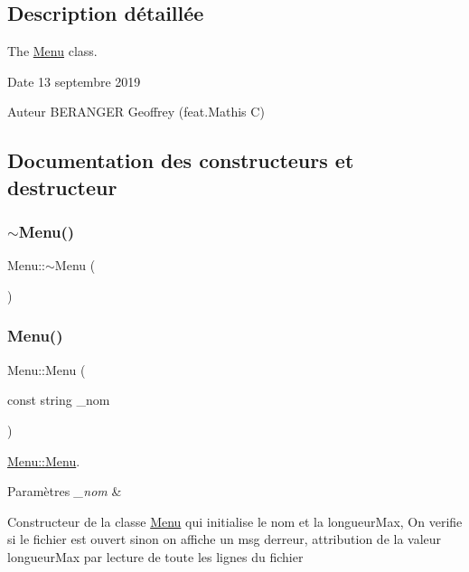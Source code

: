 \subsection{Description détaillée}
The \hyperlink{class_menu}{Menu} class. 

\begin{DoxyDate}{Date}
13 septembre 2019 
\end{DoxyDate}
\begin{DoxyAuthor}{Auteur}
B\+E\+R\+A\+N\+G\+ER Geoffrey (feat.\+Mathis C) 
\end{DoxyAuthor}


\subsection{Documentation des constructeurs et destructeur}
\mbox{\label{class_menu_a831387f51358cfb88cd018e1777bc980}} 
\subsubsection{\texorpdfstring{$\sim$\+Menu()}{~Menu()}}
{\footnotesize\ttfamily Menu\+::$\sim$\+Menu (\begin{DoxyParamCaption}{ }\end{DoxyParamCaption})}

\mbox{\label{class_menu_a3ec2bde9fc4dfdf5d4e8afcc562fd58f}} 
\subsubsection{\texorpdfstring{Menu()}{Menu()}}
{\footnotesize\ttfamily Menu\+::\+Menu (\begin{DoxyParamCaption}\item[{const string}]{\+\_\+nom }\end{DoxyParamCaption})}



\hyperlink{class_menu_a3ec2bde9fc4dfdf5d4e8afcc562fd58f}{Menu\+::\+Menu}. 


\begin{DoxyParams}{Paramètres}
{\em \+\_\+nom} & \\
\hline
\end{DoxyParams}
Constructeur de la classe \hyperlink{class_menu}{Menu} qui initialise le nom et la longueur\+Max, On verifie si le fichier est ouvert sinon on affiche un msg d\textquotesingle{}erreur, attribution de la valeur longueur\+Max par lecture de toute les lignes du fichier 


